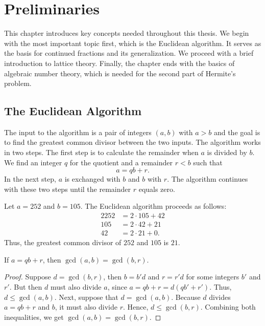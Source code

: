 \chapter{Preliminaries}
\label{ch:preliminaries}

This chapter introduces key concepts needed throughout this thesis.
We begin with the most important topic first,
which is the Euclidean algorithm.
It serves as the basis for continued fractions and its generalization.
We proceed with a brief introduction to lattice theory.
Finally, the chapter ends with the basics of algebraic number theory,
which is needed for the second part of Hermite's problem.

\section{The Euclidean Algorithm}

The input to the algorithm is a pair of integers $(a, b)$ with $a > b$ and the
goal is to find the greatest common divisor between the two inputs.
The algorithm works in two steps.
The first step is to calculate the remainder when $a$ is divided by $b$.
We find an integer $q$ for the quotient and a remainder $r < b$ such that
\[
  a = q b + r.
\]
In the next step, $a$ is exchanged with $b$ and $b$ with $r$.
The algorithm continues with these two steps until the remainder $r$ equals zero.

\begin{example}
  Let $a = 252$ and $b = 105$.
  The Euclidean algorithm proceeds as follows:
  \begin{alignat*}{2}
    252 & = 2 · 105 + 42 \\
    105 & = 2 · 42 + 21 \\
    42 & = 2 · 21 + 0.
  \end{alignat*}
  Thus, the greatest common divisor of $252$ and $105$ is $21$.
\end{example}

\begin{lemma}
  If $a = qb + r$, then $\gcd(a, b) = \gcd(b, r)$.
\end{lemma}

\begin{proof}
  Suppose $d = \gcd(b, r)$, then $b = b'd$ and $r = r'd$ for some integers $b'$ and $r'$.
  But then $d$ must also divide $a$, since $a = qb + r = d(qb' + r')$.
  Thus, $d ≤ \gcd(a, b)$.
  Next, suppose that $d = \gcd(a, b)$.
  Because $d$ divides $a = qb + r$ and $b$,
  it must also divide $r$.
  Hence, $d ≤ \gcd(b, r)$.
  Combining both inequalities, we get $\gcd(a, b) = \gcd(b, r)$.
\end{proof}

